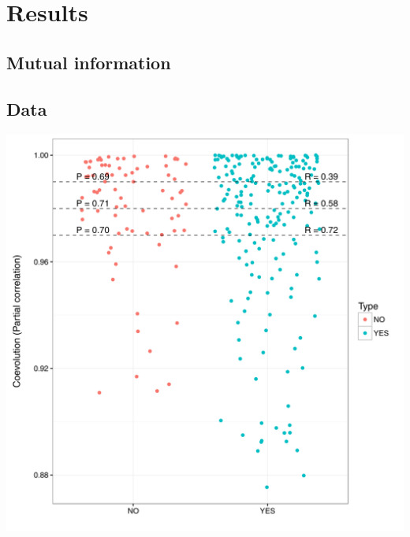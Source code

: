 \documentclass[11pt]{article}
\begin{document}
\section{Results}
\subsection{Mutual information}
\subsection{Data}
\includegraphics{partial_corr}



	
\end{document}
